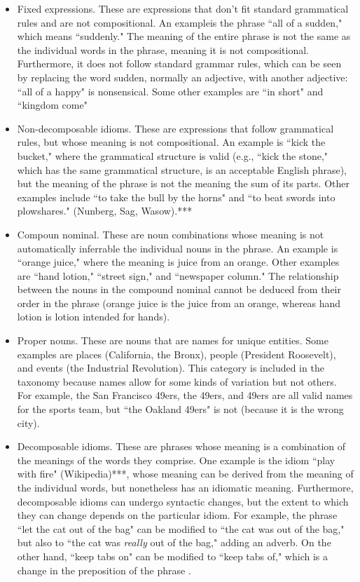 \documentclass[11pt]{article}
\begin{document}
\begin{itemize}
\item Fixed expressions. These are expressions that don't fit standard grammatical rules and are not compositional. An exampleis the phrase ``all of a sudden," which means ``suddenly." The meaning of the entire phrase is not the same as the individual words in the phrase, meaning it is not compositional. Furthermore, it does not follow standard grammar rules, which can be seen by replacing the word sudden, normally an adjective, with another adjective: ``all of a happy" is nonsensical. Some other examples are ``in short" and ``kingdom come"

\item Non-decomposable idioms. These are expressions that follow grammatical rules, but whose meaning is not compositional. An example is ``kick the bucket," where the grammatical structure is valid (e.g., ``kick the stone," which has the same grammatical structure, is an acceptable English phrase), but the meaning of the phrase is not the meaning the sum of its parts. Other examples include ``to take the bull by the horns" and ``to beat swords into plowshares." (Nunberg, Sag, Wasow).***

\item Compoun nominal. These are noun combinations whose meaning is not automatically inferrable the individual nouns in the phrase. An example is ``orange juice," where the meaning is juice from an orange. Other examples are ``hand lotion," ``street sign," and ``newspaper column." The relationship between the nouns in the compound nominal cannot be deduced from their order in the phrase (orange juice is the juice from an orange, whereas hand lotion is lotion intended for hands).

\item Proper nouns. These are nouns that are names for unique entities. Some examples are places (California, the Bronx), people (President Roosevelt), and events (the Industrial Revolution). This category is included in the taxonomy because names allow for some kinds of variation but not others. For example, the San Francisco 49ers, the 49ers, and 49ers are all valid names for the sports team, but ``the Oakland 49ers" is not (because it is the wrong city).

\item Decomposable idioms. These are phrases whose meaning is a combination of the meanings of the words they comprise. One example is the idiom ``play with fire" (Wikipedia)***, whose meaning can be derived from the meaning of the individual words, but nonetheless has an idiomatic meaning. Furthermore, decomposable idioms can undergo syntactic changes, but the extent to which they can change depends on the particular idiom. For example, the phrase ``let the cat out of the bag" can be modified to ``the cat was out of the bag," but also to ``the cat was \textit{really} out of the bag," adding an adverb. On the other hand, ``keep tabs on" can be modified to ``keep tabs of,"  which is a change in the preposition of the phrase \cite{Riehemann01aconstructional}. 


\end{itemize}
\end{document}
